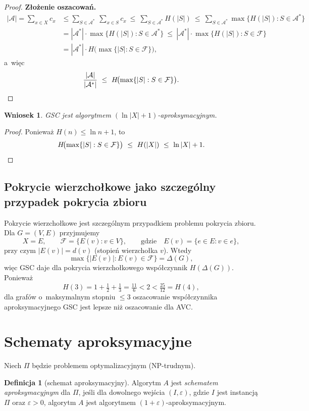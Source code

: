 \documentclass[11pt,a4paper]{article}
\theoremstyle{plain}
\newtheorem{wniosek}[twierdzenie]{Wniosek}
\theoremstyle{definition}
\newtheorem{definicja}[twierdzenie]{Definicja}
\newcommand{\eps}{\varepsilon}
\newcommand{\F}{\mathcal{F}}
\newcommand{\Acov}{\mathcal{A}}
\begin{document}
\begin{proof}
\medskip
\noindent\textbf{Złożenie oszacowań.}
\begin{align*}
|\Acov|=\sum_{x\in X}c_x
&\le\sum_{S\in\Acov^{*}}\ \sum_{x\in S}c_x
\ \le\ \sum_{S\in\Acov^{*}}H(|S|)
\ \le\ \sum_{S\in\Acov^{*}}\max\{H(|S|):S\in\Acov^{*}\}\\
&=|\Acov^{*}|\cdot\max\{H(|S|):S\in\Acov^{*}\}
\ \le\ |\Acov^{*}|\cdot\max\{H(|S|):S\in\F\}\\
&=|\Acov^{*}|\cdot H\!\bigl(\max\{|S|:S\in\F\}\bigr),
\end{align*}
a~więc
\[
\frac{|\Acov|}{|\Acov^{*}|}\ \le\ H\!\bigl(\max\{|S|:S\in\F\}\bigr). \qedhere
\]
\end{proof}

\begin{wniosek}\label{wn:gsc-ln}
\textsc{GSC} jest algorytmem $(\ln|X|+1)$-aproksymacyjnym.
\end{wniosek}
\begin{proof}
Ponieważ $H(n)\le\ln n+1$, to
\[
H\!\bigl(\max\{|S|:S\in\F\}\bigr)\ \le\ H(|X|)\ \le\ \ln|X|+1. \qedhere
\]
\end{proof}

\subsection*{Pokrycie wierzchołkowe jako szczególny przypadek pokrycia zbioru}
Pokrycie wierzchołkowe jest szczególnym przypadkiem problemu pokrycia zbioru. Dla
$G=(V,E)$ przyjmujemy
\[
X=E,\qquad \F=\{E(v):v\in V\},\qquad\text{gdzie}\quad E(v)=\{e\in E: v\in e\},
\]
przy czym $|E(v)|=d(v)$ (stopień wierzchołka $v$). Wtedy
\[
\max\{|E(v)|:E(v)\in\F\}=\Delta(G),
\]
więc \textsc{GSC} daje dla pokrycia wierzchołkowego współczynnik $H(\Delta(G))$.
Ponieważ
\[
H(3)=1+\tfrac12+\tfrac13=\tfrac{11}{6}<2<\tfrac{25}{12}=H(4),
\]
dla grafów o~maksymalnym stopniu $\le 3$ oszacowanie współczynnika aproksymacyjnego
\textsc{GSC} jest lepsze niż oszacowanie dla \textsc{AVC}.

\section{Schematy aproksymacyjne}\label{sec:schemes}

Niech $\Pi$ będzie problemem optymalizacyjnym (NP-trudnym).

\begin{definicja}[schemat aproksymacyjny]
Algorytm $A$ jest \emph{schematem aproksymacyjnym} dla $\Pi$, jeśli dla dowolnego
wejścia $(I,\eps)$, gdzie $I$ jest instancją $\Pi$ oraz $\eps>0$, algorytm $A$ jest
algorytmem $(1+\eps)$-aproksymacyjnym.
\end{definicja}
\end{document}
